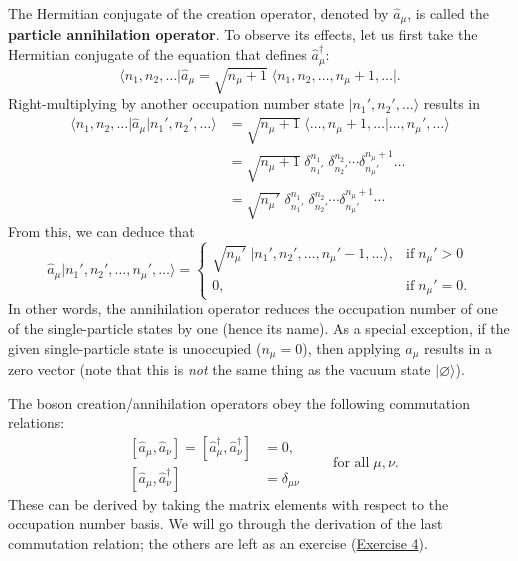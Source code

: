 \documentclass[pra,12pt]{revtex4}
\begin{document}
The Hermitian conjugate of the creation operator, denoted by $\hat{a}_\mu$,
is called the \textbf{particle annihilation operator}.  To observe its
effects, let us first take the Hermitian conjugate of the equation
that defines $\hat{a}_\mu^\dagger$:
$$\big\langle n_1, n_2, \dots\big| \hat{a}_\mu = \sqrt{n_\mu+1} \; \big\langle n_1, n_2, \dots, n_\mu + 1, \dots\big|. $$
Right-multiplying by another occupation number state
$|n_1',n_2',\dots\rangle$ results in
$$\begin{aligned}\big\langle n_1, n_2, \dots \big| \hat{a}_\mu \big|n_1',n_2',\dots\big\rangle &= \sqrt{n_\mu+1} \; \big\langle \dots, n_\mu + 1, \dots\big| \dots, n_\mu',\dots\big\rangle \\&= \sqrt{n_\mu+1}\; \delta^{n_1}_{n_1'}\; \delta^{n_2}_{n_2'} \cdots \delta^{n_\mu+1}_{n_\mu'} \dots \\  &= \sqrt{n_\mu'}\; \delta^{n_1}_{n_1'}\; \delta^{n_2}_{n_2'} \cdots \delta^{n_\mu+1}_{n_\mu'}\cdots\end{aligned}$$
From this, we can deduce that
$$\hat{a}_\mu \big|n_1', n_2', \dots, n_\mu', \dots\big\rangle = \begin{cases} \sqrt{n_\mu'} \; \big|n_1', n_2', \dots, n_\mu' - 1, \dots\big\rangle, & \mathrm{if}\; n_\mu' > 0 \\ 0, & \mathrm{if}\; n_\mu' = 0.\end{cases} $$
In other words, the annihilation operator reduces the occupation
number of one of the single-particle states by one (hence its name).
As a special exception, if the given single-particle state is
unoccupied ($n_\mu = 0$), then applying $\hat{a}_\mu$ results in a zero
vector (note that this is \textit{not} the same thing as the vacuum
state $|\varnothing\rangle$).

The boson creation/annihilation operators obey the following
commutation relations:
$$\boxed{\quad\begin{aligned}\,[\hat{a}_\mu,\hat{a}_\nu] = [\hat{a}_\mu^\dagger,\hat{a}_\nu^\dagger] &= 0, \\ \,[\hat{a}_\mu,\hat{a}_\nu^\dagger] &= \delta_{\mu\nu}\end{aligned}\qquad\textrm{for all}\;\mu,\nu.\quad}$$
These can be derived by taking the matrix elements with respect to the
occupation number basis.  We will go through the derivation of the
last commutation relation; the others are left as an exercise
(\hyperref[ex:boson_commutators]{Exercise 4}).
\end{document}
